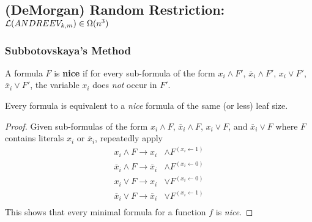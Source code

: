 \documentclass[11pt]{article}
\begin{document}
	\subsection{(DeMorgan) Random Restriction: \texorpdfstring{$\mathcal{L}(ANDREEV_{k,m}) \in \Omega(n^3)$}{L(ANDREEVkm) in Omega(n3)}}
	\subsubsection{Subbotovskaya's Method} 
	\begin{definition}
		A formula $F$ is \textbf{nice} if for every sub-formula of the form $x_i \land F'$, $\overline{x}_i \land F'$, $x_i \lor F'$, $\overline{x}_i \lor F'$, the variable $x_i$ does \emph{not} occur in $F'$.
	\end{definition}
	
	\begin{lemma}
		Every formula is equivalent to a \emph{nice} formula of the same (or less) leaf size.
	\end{lemma}
	\begin{proof}
		Given sub-formulas of the form $x_i \land F$, $\overline{x}_i \land F$, $x_i \lor F$, and $\overline{x}_i \lor F$ where $F$ contains literals $x_i$ or $\overline{x}_i$, repeatedly apply 
		\begin{align*}
			x_i \land F \rightarrow x_i &\land F^{(x_i \leftarrow 1)}\\
			\overline{x}_i \land F \rightarrow \overline{x}_i &\land F^{(x_i \leftarrow 0)}\\
			x_i \lor F \rightarrow x_i &\lor F^{(x_i \leftarrow 0)}\\
			\overline{x}_i \lor F \rightarrow \overline{x}_i &\lor F^{(x_i \leftarrow 1)}\\
		\end{align*}
		This shows that every minimal formula for a function $f$ is \emph{nice}.
	\end{proof}
	
\end{document}
